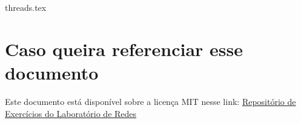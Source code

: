 \documentclass{article}
\author{}
\date{}
\title{}
\begin{document}
    

    {threads.tex}

    \section*{Caso queira referenciar esse documento}
    Este documento está disponível sobre a licença MIT nesse link: \href{https://github.com/Trees-Over-The-Lake/Laboratorio-de-Redes/blob/main/M%C3%B3dulo%204%20-%20Processos%20Threads/main.pdf}{Repositório de Exercícios do Laboratório de Redes}
\end{document}
